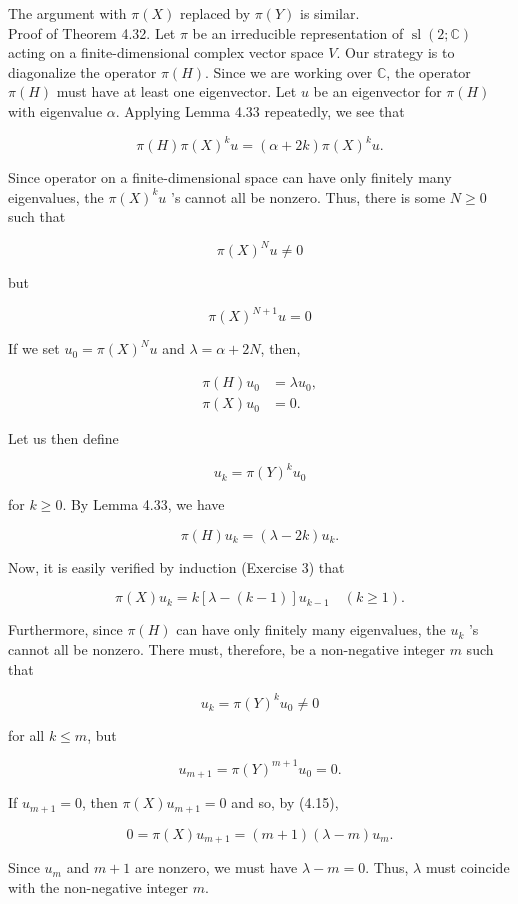 \documentclass[10pt, letterpaper]{article}
\begin{document}
The argument with $\pi(X)$ replaced by $\pi(Y)$ is similar.\\
Proof of Theorem 4.32. Let $\pi$ be an irreducible representation of $\operatorname{sl}(2 ; \mathbb{C})$ acting on a finite-dimensional complex vector space $V$. Our strategy is to diagonalize the operator $\pi(H)$. Since we are working over $\mathbb{C}$, the operator $\pi(H)$ must have at least one eigenvector. Let $u$ be an eigenvector for $\pi(H)$ with eigenvalue $\alpha$. Applying Lemma 4.33 repeatedly, we see that

$$
\pi(H) \pi(X)^{k} u=(\alpha+2 k) \pi(X)^{k} u .
$$

Since operator on a finite-dimensional space can have only finitely many eigenvalues, the $\pi(X)^{k} u$ 's cannot all be nonzero. Thus, there is some $N \geq 0$ such that

$$
\pi(X)^{N} u \neq 0
$$

but

$$
\pi(X)^{N+1} u=0
$$

If we set $u_{0}=\pi(X)^{N} u$ and $\lambda=\alpha+2 N$, then,

$$
\begin{aligned}
\pi(H) u_{0} & =\lambda u_{0}, \\
\pi(X) u_{0} & =0 .
\end{aligned}
$$

Let us then define

$$
u_{k}=\pi(Y)^{k} u_{0}
$$

for $k \geq 0$. By Lemma 4.33, we have

$$
\pi(H) u_{k}=(\lambda-2 k) u_{k} .
$$

Now, it is easily verified by induction (Exercise 3) that

$$
\pi(X) u_{k}=k[\lambda-(k-1)] u_{k-1} \quad(k \geq 1) .
$$

Furthermore, since $\pi(H)$ can have only finitely many eigenvalues, the $u_{k}$ 's cannot all be nonzero. There must, therefore, be a non-negative integer $m$ such that

$$
u_{k}=\pi(Y)^{k} u_{0} \neq 0
$$

for all $k \leq m$, but

$$
u_{m+1}=\pi(Y)^{m+1} u_{0}=0 .
$$

If $u_{m+1}=0$, then $\pi(X) u_{m+1}=0$ and so, by (4.15),

$$
0=\pi(X) u_{m+1}=(m+1)(\lambda-m) u_{m} .
$$

Since $u_{m}$ and $m+1$ are nonzero, we must have $\lambda-m=0$. Thus, $\lambda$ must coincide with the non-negative integer $m$.
\end{document}

